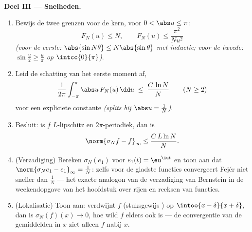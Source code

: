 \begin{problem}
\medskip
\noindent\textbf{Deel III --- Snelheden.}
\begin{enumerate}[resume]
  \item Bewijs de twee grenzen voor de kern, voor $0 < \abs u \leq
        \pi$:
        \[
        F_N(u) \leq N,
        \qquad
        F_N(u) \leq \frac{\pi^2}{N u^2}
        \]
        \emph{(voor de eerste: $\abs{\sin N\theta} \leq
        N\abs{\sin\theta}$ met inductie; voor de tweede:
        $\sin\frac u2 \geq \frac{u}{\pi}$ op $\intcc{0}{\pi}$)}.
  \item Leid de schatting van het eerste moment af,
        \[
        \frac{1}{2\pi}\int_{-\pi}^{\pi}\abs u\,F_N(u)\,\dd u
        \;\leq\; \frac{C\,\ln N}{N}
        \qquad (N \geq 2)
        \]
        voor een expliciete constante \emph{(splits bij $\abs u =
        \frac1N$)}.
  \item Besluit: is $f$ $L$-lipschitz en $2\pi$-periodiek, dan is
        \[
        \norm{\sigma_N f - f}_\infty \leq \frac{C\,L\ln N}{N} .
        \]
  \item (Verzadiging) Bereken $\sigma_N(e_1)$ voor $e_1(t) =
        \eu^{\iu t}$ en toon aan dat $\norm{\sigma_Ne_1 -
        e_1}_\infty = \frac1N$: zelfs voor de gladste functies
        convergeert Fejér niet sneller dan $\frac1N$ --- het
        exacte analogon van de verzadiging van Bernstein in de
        weekendopgave van het hoofdstuk over rijen en reeksen van
        functies.
  \item (Lokalisatie) Toon aan: verdwijnt $f$ (stuksgewijs
        ) op $\intoo{x - \delta}{x + \delta}$, dan is
        $\sigma_N(f)(x) \to 0$, hoe wild $f$ elders ook is --- de
        convergentie van de gemiddelden in $x$ ziet alleen $f$
        nabij $x$.
\end{enumerate}


\end{problem}
